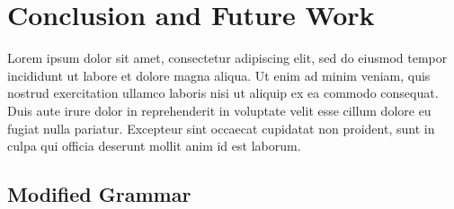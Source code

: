 \documentclass[letterpaper,twocolumn,11pt]{article}
\begin{document}
\section{Conclusion and Future Work} \label{conclusion}
Lorem ipsum dolor sit amet, consectetur adipiscing elit, sed do eiusmod tempor incididunt ut labore et dolore magna aliqua. Ut enim ad minim veniam, quis nostrud exercitation ullamco laboris nisi ut aliquip ex ea commodo consequat. Duis aute irure dolor in reprehenderit in voluptate velit esse cillum dolore eu fugiat nulla pariatur. Excepteur sint occaecat cupidatat non proident, sunt in culpa qui officia deserunt mollit anim id est laborum.

{\footnotesize 
  }

\theendnotes


\begin{appendices}

\section{Modified Grammar} \label{App:grammar}

\end{appendices}
\end{document}
